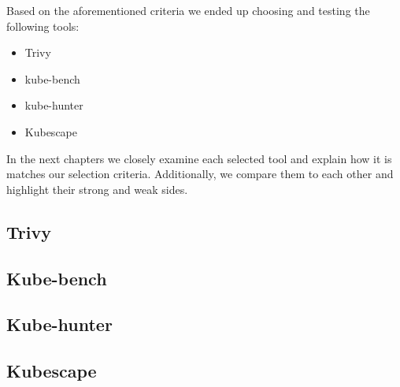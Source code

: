 Based on the aforementioned criteria we ended up choosing and testing the following tools:
\begin{itemize}
\item Trivy
\item kube-bench
\item kube-hunter
\item Kubescape
\end{itemize}

In the next chapters we closely examine each selected tool and explain how it is matches our selection criteria. Additionally, we compare them to each other and highlight their strong and weak sides.

\subsection{Trivy}

\subsection{Kube-bench}

\subsection{Kube-hunter}

\subsection{Kubescape}